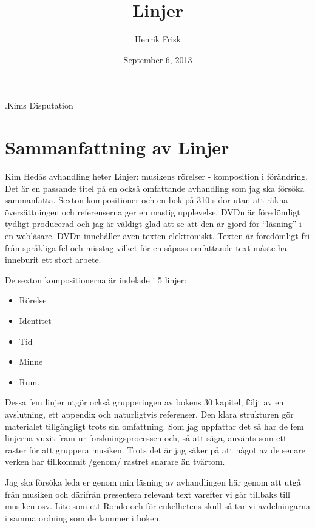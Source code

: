 \documentclass{article}
\begin{document}
\title{Linjer}
\author{Henrik Frisk}
\date{September  6, 2013}

\maketitle



.\label{1}Kims Disputation

\section{Sammanfattning av Linjer}

Kim Hedås avhandling heter Linjer: musikens rörelser - komposition i förändring. Det är en passande titel på en också omfattande avhandling som jag ska försöka sammanfatta. Sexton kompositioner och en bok på 310 sidor utan att räkna översättningen och referenserna ger en mastig upplevelse. DVDn är föredömligt tydligt producerad och jag är väldigt glad att se att den är gjord för ``läsning'' i en webläsare. DVDn innehåller även texten elektroniskt. Texten är föredömligt fri från språkliga fel och misstag vilket för en såpass omfattande text måste ha inneburit ett stort arbete.

De sexton kompositionerna är indelade i 5 linjer:

\begin{itemize}
\item Rörelse
\item Identitet
\item Tid
\item Minne
\item Rum.
\end{itemize}

Dessa fem linjer utgör också grupperingen av bokens 30 kapitel, följt av en avslutning, ett appendix och naturligtvis referenser. Den klara strukturen gör materialet tillgängligt trots sin omfattning. Som jag uppfattar det så har de fem linjerna vuxit fram ur forskningsprocessen och, så att säga, använts som ett raster för att gruppera musiken. Trots det är jag säker på att något av de senare verken har tillkommit /genom/ rastret snarare än tvärtom.

Jag ska försöka leda er genom min läsning av avhandlingen här genom att utgå från musiken och därifrån presentera relevant text varefter vi går tillbaks till musiken osv. Lite som ett Rondo och för enkelhetens skull så tar vi avdelningarna i samma ordning som de kommer i boken.
\end{document}
